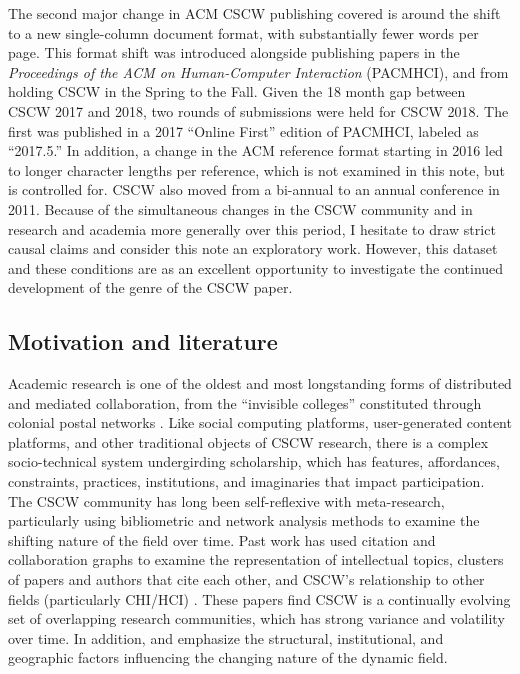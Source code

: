 \documentclass[format=acmsmall, screen=true]{acmart}
\begin{document}
The second major change in ACM CSCW publishing covered is around the shift to a new single-column document format, with substantially fewer words per page. This format shift was introduced alongside publishing papers in the \textit{Proceedings of the ACM on Human-Computer Interaction} (PACMHCI), and from holding CSCW in the Spring to the Fall. Given the 18 month gap between CSCW 2017 and 2018, two rounds of submissions were held for CSCW 2018. The first was published in a 2017 ``Online First'' edition of PACMHCI, labeled as ``2017.5.'' In addition, a change in the ACM reference format starting in 2016 led to longer character lengths per reference, which is not examined in this note, but is controlled for. CSCW also moved from a bi-annual to an annual conference in 2011. Because of the simultaneous changes in the CSCW community and in research and academia more generally over this period, I hesitate to draw strict causal claims and consider this note an exploratory work. However, this dataset and these conditions are as an excellent opportunity to investigate the continued development of the genre of the CSCW paper.

\subsection{Motivation and literature}
Academic research is one of the oldest and most longstanding forms of distributed and mediated collaboration, from the ``invisible colleges'' constituted through colonial postal networks \cite{shapin_leviathan_1985}. Like social computing platforms, user-generated content platforms, and other traditional objects of CSCW research, there is a complex socio-technical system undergirding scholarship, which has features, affordances, constraints, practices, institutions, and imaginaries that impact participation. The CSCW community has long been self-reflexive with meta-research, particularly using bibliometric and network analysis methods to examine the shifting nature of the field over time. Past work has used citation and collaboration graphs to examine the representation of intellectual topics, clusters of papers and authors that cite each other, and CSCW's relationship to other fields (particularly CHI/HCI) \cite{Wallace2017, Correia2018, Jacovi2006, Horn2004, Keegan2013}. These papers find CSCW is a continually evolving set of overlapping research communities, which has strong variance and volatility over time. In addition, \cite{Keegan2013} and \cite{correia2019effect} emphasize the structural, institutional, and geographic factors influencing the changing nature of the dynamic field. 
\end{document}
